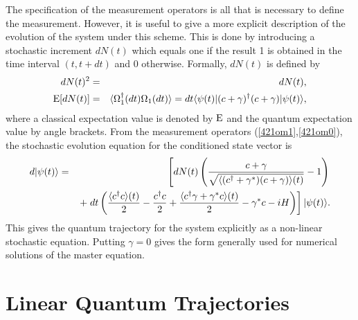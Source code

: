 \documentclass[12pt]{article}
\begin{document}
The specification of the measurement operators is all that is necessary to
define the measurement. However, it is useful to give a more explicit
description of the evolution of the system under this scheme. This is done by
introducing a stochastic increment $dN(t)$ which equals one if the result 1 is
obtained in the time interval $(t,t+dt)$ and 0 otherwise. Formally, $dN(t)$ is
defined by
\begin{eqnarray}
dN(t)^2 &=& dN(t) ,\\
	{\rm E}[dN(t)]&=&\langle \Omega_1^\dagger(dt)\Omega_1(dt) \rangle = dt \langle {\psi(t)} |
(c+\gamma)^\dagger (c+\gamma) | {\psi(t)} \rangle,
\end{eqnarray}
where a classical expectation value is denoted by ${\rm E}$ and the quantum
expectation value by angle brackets. 
From the measurement operators (\ref{421om1},\ref{421om0}), 
the stochastic evolution equation for the conditioned state vector is
\begin{eqnarray} 
d|\psi (t) \rangle  &=& \left[ dN(t)\left( \frac{c+\gamma}
{\sqrt{\langle (c^\dagger+\gamma^*)(c+\gamma)\rangle(t)}} - 1 \right)\right. \nonumber \\
&& \left. + \; dt \left( \frac{\langle 
c^\dagger c \rangle(t)}{2} - \frac{c^\dagger c}{2} + 
\frac{\langle c^\dagger \gamma + \gamma^* c \rangle(t)}{2} 
- \gamma^* c -{i}H \right) \right] |\psi(t) \rangle. \label{412sse1b}
\end{eqnarray}
 This gives the quantum trajectory for the system explicitly as a non-linear
stochastic \sch equation. Putting $\gamma=0$ gives the form generally used for
numerical solutions of the master equation.

\section{Linear Quantum Trajectories}
\end{document}
